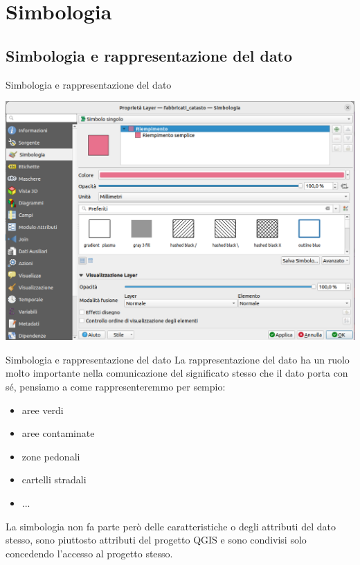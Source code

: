 \documentclass{beamer}
\begin{document}
{\section{Simbologia}
\subsection{Simbologia e rappresentazione del dato}

\begin{frame}{Simbologia e rappresentazione del dato}
    \begin{center}
        \includegraphics[width=.95\textwidth]{digitizing_pics/SImbologia del 2022-10-12 10-05-05.png}
    \end{center}
\end{frame}

\begin{frame}{Simbologia e rappresentazione del dato}
    La rappresentazione del dato ha un ruolo molto importante nella comunicazione del significato stesso che il dato porta con sé, pensiamo a come rappresenteremmo per sempio:
    \begin{itemize}
        \item aree verdi
        \item aree contaminate
        \item zone pedonali
        \item cartelli stradali
        \item ...
    \end{itemize}

    La simbologia non fa parte però delle caratteristiche o degli attributi del dato stesso, sono piuttosto attributi del progetto QGIS e sono condivisi solo concedendo l'accesso al progetto stesso.
\end{frame}


}
\end{document}
